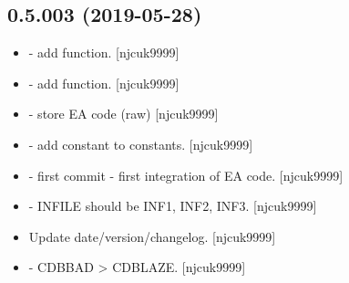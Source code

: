 \documentclass[a4paper,10pt,english]{report}
\begin{document}
\subsection{0.5.003 (2019-05-28)}
\label{\detokenize{misc/changelog:id134}}\begin{itemize}
\item {} 
 - add  function. {[}njcuk9999{]}

\item {} 
 - add  function. {[}njcuk9999{]}

\item {} 
 - store EA  code (raw) {[}njcuk9999{]}

\item {} 
 - add  constant to constants.
{[}njcuk9999{]}

\item {} 
 - first commit - first integration of EA
code. {[}njcuk9999{]}

\item {} 
 - INFILE should be INF1, INF2, INF3. {[}njcuk9999{]}

\item {} 
Update date/version/changelog. {[}njcuk9999{]}

\item {} 
 - CDBBAD \textendash{}\textgreater{} CDBLAZE. {[}njcuk9999{]}

\end{itemize}
\end{document}
